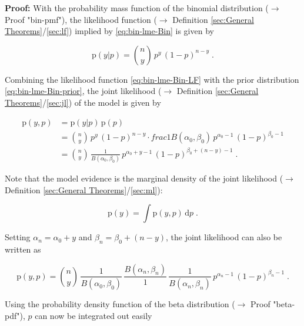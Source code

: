 \documentclass[a4paper,12pt]{book}
\begin{document}
\vspace{1em}
\textbf{Proof:} With the probability mass function of the binomial distribution ($\rightarrow$ Proof "bin-pmf"), the likelihood function ($\rightarrow$ Definition \ref{sec:General Theorems}/\ref{sec:lf}) implied by \eqref{eq:bin-lme-Bin} is given by

\begin{equation} \label{eq:bin-lme-Bin-LF}
\mathrm{p}(y|p) = {n \choose y} \, p^y \, (1-p)^{n-y} \; .
\end{equation}

Combining the likelihood function \eqref{eq:bin-lme-Bin-LF} with the prior distribution \eqref{eq:bin-lme-Bin-prior}, the joint likelihood ($\rightarrow$ Definition \ref{sec:General Theorems}/\ref{sec:jl}) of the model is given by

\begin{equation} \label{eq:bin-lme-Bin-JL-s1}
\begin{split}
\mathrm{p}(y,p) &= \mathrm{p}(y|p) \, \mathrm{p}(p) \\
&= {n \choose y} \, p^y \, (1-p)^{n-y} \cdot frac{1}{B(\alpha_0,\beta_0)} \, p^{\alpha_0-1} \, (1-p)^{\beta_0-1} \\
&= {n \choose y} \, \frac{1}{B(\alpha_0,\beta_0)} \, p^{\alpha_0+y-1} \, (1-p)^{\beta_0+(n-y)-1} \; .
\end{split}
\end{equation}

Note that the model evidence is the marginal density of the joint likelihood ($\rightarrow$ Definition \ref{sec:General Theorems}/\ref{sec:ml}):

\begin{equation} \label{eq:bin-lme-Bin-ME}
\mathrm{p}(y) = \int \mathrm{p}(y,p) \, \mathrm{d}p \; .
\end{equation}

Setting $\alpha_n = \alpha_0 + y$ and $\beta_n = \beta_0 + (n-y)$, the joint likelihood can also be written as

\begin{equation} \label{eq:bin-lme-Bin-JL-s2}
\mathrm{p}(y,p) = {n \choose y} \, \frac{1}{B(\alpha_0,\beta_0)} \, \frac{B(\alpha_n,\beta_n)}{1} \, \frac{1}{B(\alpha_n,\beta_n)} \, p^{\alpha_n-1} \, (1-p)^{\beta_n-1} \; .
\end{equation}

Using the probability density function of the beta distribution ($\rightarrow$ Proof "beta-pdf"), $p$ can now be integrated out easily
\end{document}
